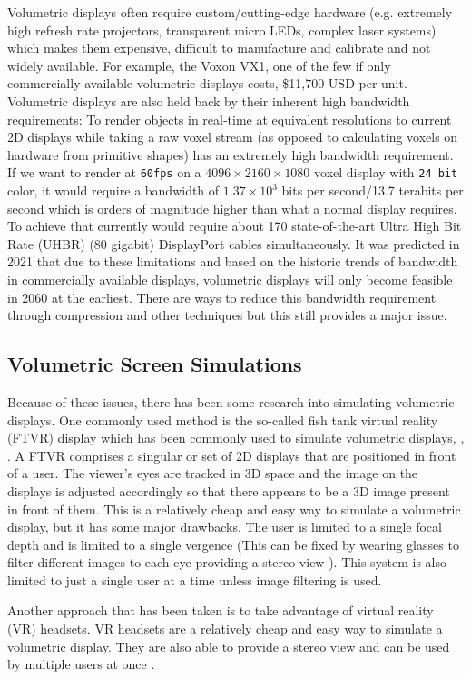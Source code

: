 Volumetric displays often require custom/cutting-edge hardware (e.g. extremely high refresh rate projectors,  transparent micro LEDs, complex laser systems) which makes them expensive, difficult to manufacture and calibrate and not widely available. For example, the Voxon VX1, one of the few if only commercially available volumetric displays costs, \$11,700 USD \cite{noauthor_products_nodate} per unit. \\

Volumetric displays are also held back by their inherent high bandwidth requirements: To render objects in real-time at equivalent resolutions to current 2D displays while taking a raw voxel stream (as opposed to calculating voxels on hardware from primitive shapes) has an extremely high bandwidth requirement. If we want to render at \texttt{60fps} on a $4096 \times 2160 \times 1080$ voxel display with \texttt{24 bit} color, it would require a bandwidth of $1.37 \times 10^3$ bits per second/13.7 terabits per second which is orders of magnitude higher than what a normal display requires. To achieve that currently would require about 170 state-of-the-art Ultra High Bit Rate (UHBR) (80 gigabit) DisplayPort cables simultaneously. It was predicted in 2021 \cite{LAM2021050011} that due to these limitations and based on the historic trends of bandwidth in commercially available displays, volumetric displays will only become feasible in 2060 at the earliest. There are ways to reduce this bandwidth requirement through compression and other techniques \cite{4487481} but this still provides a major issue. \\

\subsection{Volumetric Screen Simulations}
Because of these issues, there has been some research into simulating volumetric displays. One commonly used method is the so-called fish tank virtual reality (FTVR) display \cite{10.1145/169059.169066} which has been commonly used to simulate volumetric displays, \cite{10.1145/3281505.3281540}, \cite{Zabarauskas2012}. A FTVR comprises a singular or set of 2D displays that are positioned in front of a user. The viewer's eyes are tracked in 3D space and the image on the displays is adjusted accordingly so that there appears to be a 3D image present in front of them. This is a relatively cheap and easy way to simulate a volumetric display, but it has some major drawbacks. The user is limited to a single focal depth and is limited to a single vergence (This can be fixed by wearing glasses to filter different images to each eye providing a stereo view \cite{5701756}). This system is also limited to just a single user at a time unless image filtering is used. 

Another approach that has been taken is to take advantage of virtual reality (VR) headsets. VR headsets are a relatively cheap and easy way to simulate a volumetric display. They are also able to provide a stereo view and can be used by multiple users at once \cite{10.1145/3290605.3300763}.